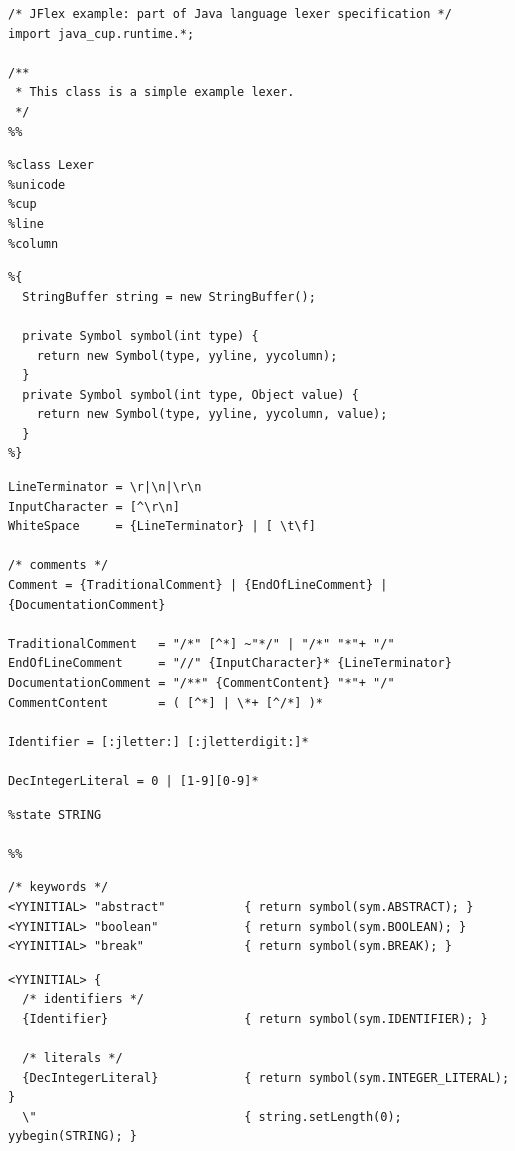 \documentclass[11pt]{scrartcl}
\newcommand{\xtiny}{\small}
\begin{document}
{\xtiny
\label{CodeTop}\begin{verbatim}
/* JFlex example: part of Java language lexer specification */
import java_cup.runtime.*;

/**
 * This class is a simple example lexer.
 */
%%
\end{verbatim}
\label{CodeOptions}\begin{verbatim}
%class Lexer
%unicode
%cup
%line
%column
\end{verbatim}
\label{CodeScannerCode}\begin{verbatim}
%{
  StringBuffer string = new StringBuffer();

  private Symbol symbol(int type) {
    return new Symbol(type, yyline, yycolumn);
  }
  private Symbol symbol(int type, Object value) {
    return new Symbol(type, yyline, yycolumn, value);
  }
%}
\end{verbatim}
\label{CodeMacros}\begin{verbatim}
LineTerminator = \r|\n|\r\n
InputCharacter = [^\r\n]
WhiteSpace     = {LineTerminator} | [ \t\f]

/* comments */
Comment = {TraditionalComment} | {EndOfLineComment} | {DocumentationComment}

TraditionalComment   = "/*" [^*] ~"*/" | "/*" "*"+ "/"
EndOfLineComment     = "//" {InputCharacter}* {LineTerminator}
DocumentationComment = "/**" {CommentContent} "*"+ "/"
CommentContent       = ( [^*] | \*+ [^/*] )*

Identifier = [:jletter:] [:jletterdigit:]*

DecIntegerLiteral = 0 | [1-9][0-9]*
\end{verbatim}
\label{CodeStateDecl}\begin{verbatim}
%state STRING

%%
\end{verbatim}
\label{CodeRulesYYINITIAL}\begin{verbatim}
/* keywords */
<YYINITIAL> "abstract"           { return symbol(sym.ABSTRACT); }
<YYINITIAL> "boolean"            { return symbol(sym.BOOLEAN); }
<YYINITIAL> "break"              { return symbol(sym.BREAK); }
\end{verbatim}
\label{CodeRulesBunch}\begin{verbatim}
<YYINITIAL> {
  /* identifiers */ 
  {Identifier}                   { return symbol(sym.IDENTIFIER); }
 
  /* literals */
  {DecIntegerLiteral}            { return symbol(sym.INTEGER_LITERAL); }
  \"                             { string.setLength(0); yybegin(STRING); }


\end{verbatim}}
\end{document}
